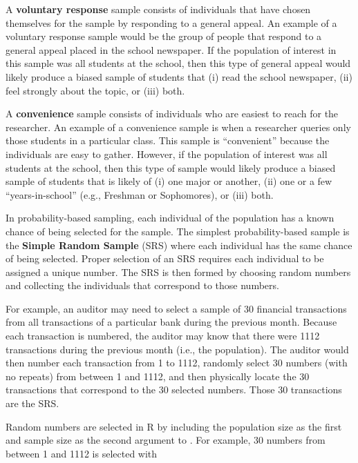 \documentclass[10pt,openany]{book}\usepackage[]{graphicx}\usepackage[]{color}
\begin{document}
A \textbf{voluntary response} sample consists of individuals that have chosen themselves for the sample by responding to a general appeal. An example of a voluntary response sample would be the group of people that respond to a general appeal placed in the school newspaper. If the population of interest in this sample was all students at the school, then this type of general appeal would likely produce a biased sample of students that (i) read the school newspaper, (ii) feel strongly about the topic, or (iii) both.

A \textbf{convenience} sample consists of individuals who are easiest to reach for the researcher. An example of a convenience sample is when a researcher queries only those students in a particular class. This sample is ``convenient'' because the individuals are easy to gather. However, if the population of interest was all students at the school, then this type of sample would likely produce a biased sample of students that is likely of (i) one major or another, (ii) one or a few ``years-in-school'' (e.g., Freshman or Sophomores), or (iii) both.

In probability-based sampling, each individual of the population has a known chance of being selected for the sample. The simplest probability-based sample is the \textbf{Simple Random Sample} (SRS) where each individual has the same chance of being selected. Proper selection of an SRS requires each individual to be assigned a unique number. The SRS is then formed by choosing random numbers and collecting the individuals that correspond to those numbers.

For example, an auditor may need to select a sample of 30 financial transactions from all transactions of a particular bank during the previous month. Because each transaction is numbered, the auditor may know that there were 1112 transactions during the previous month (i.e., the population). The auditor would then number each transaction from 1 to 1112, randomly select 30 numbers (with no repeats) from between 1 and 1112, and then physically locate the 30 transactions that correspond to the 30 selected numbers. Those 30 transactions are the SRS.

Random numbers are selected in R by including the population size as the first and sample size as the second argument to . For example, 30 numbers from between 1 and 1112 is selected with
\end{document}
